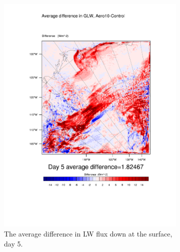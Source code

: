 \begin{figure}
	\begin{subfigure}{0.48\textwidth}
		\centering
		\includegraphics[width=\textwidth]{results/aero10/diff_Aero10_GLW_Day5.pdf}
		\caption{The average difference in LW flux down at the surface, day 5.}
		\label{subfig:glw_r3Day5}
	\end{subfigure}
	\quad
	\begin{subfigure}{0.48\textwidth}
		\centering

\end{subfigure}
\end{figure}
